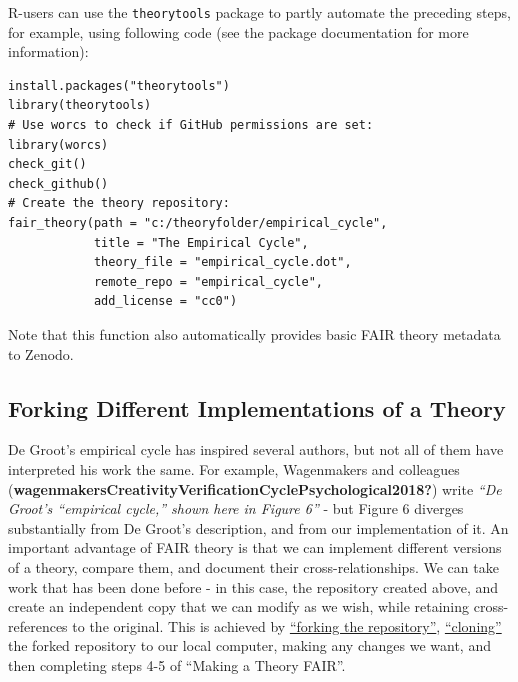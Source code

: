 \documentclass[
  man,floatsintext]{apa6}
\begin{document}
R-users can use the \texttt{theorytools} package to partly automate the preceding steps, for example, using following code (see the package documentation for more information):

\begin{verbatim}
install.packages("theorytools")
library(theorytools)
# Use worcs to check if GitHub permissions are set:
library(worcs)
check_git()
check_github()
# Create the theory repository:
fair_theory(path = "c:/theoryfolder/empirical_cycle",
            title = "The Empirical Cycle",
            theory_file = "empirical_cycle.dot",
            remote_repo = "empirical_cycle",
            add_license = "cc0")
\end{verbatim}

Note that this function also automatically provides basic FAIR theory metadata to Zenodo.

\subsection{Forking Different Implementations of a Theory}\label{forking-different-implementations-of-a-theory}

De Groot's empirical cycle has inspired several authors,
but not all of them have interpreted his work the same.
For example, Wagenmakers and colleagues (\textbf{wagenmakersCreativityVerificationCyclePsychological2018?}) write \emph{``De Groot's ``empirical cycle,'' shown here in Figure 6''} - but Figure 6 diverges substantially from De Groot's description, and from our implementation of it.
An important advantage of FAIR theory is that we can implement different versions of a theory, compare them, and document their cross-relationships.
We can take work that has been done before - in this case, the repository created above, and create an independent copy that we can modify as we wish, while retaining cross-references to the original.
This is achieved by \href{https://docs.github.com/en/pull-requests/collaborating-with-pull-requests/working-with-forks/fork-a-repo}{``forking the repository''},
\href{https://docs.github.com/en/pull-requests/collaborating-with-pull-requests/working-with-forks/fork-a-repo}{``cloning''} the forked repository to our local computer,
making any changes we want, and then completing steps 4-5 of ``Making a Theory FAIR''.
\end{document}
